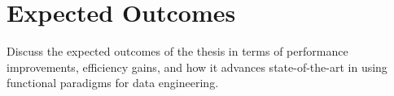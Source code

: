 \chapter{Expected Outcomes}

Discuss the expected outcomes of the thesis in terms of performance improvements, efficiency gains, and how it advances state-of-the-art in using functional paradigms for data engineering.